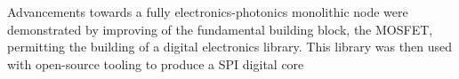 Advancements towards a fully electronics-photonics monolithic node were demonstrated by improving of the fundamental building block, the MOSFET, permitting the building of a digital electronics library. 
This library was then used with open-source tooling to produce a SPI digital core 